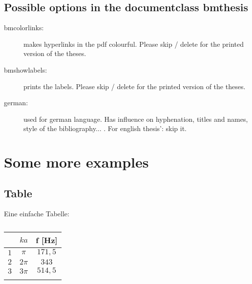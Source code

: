 \subsection{Possible options in the documentclass bmthesis}

\begin{description}
	\item[bmcolorlinks:]  makes hyperlinks in the pdf colourful. Please skip / delete for the printed version of the theses.
	\item[bmshowlabels:] prints the labels. Please skip / delete for the printed version of the theses.
	\item[german:] used for german language. Has influence on hyphenation, titles and names, style of the bibliography... . For english thesis': skip it.
\end{description}


\section{Some more examples}
\label{sec:more_ex}
\subsection{Table}
\label{sec:table}
Eine einfache Tabelle:

\begin{table}[htb]
	\centering
		\begin{tabular}{ccc} \firsthline
	   &  $ka$ & f [Hz] \\\hline
		$1$ & $\pi$ & $171,5$ \\
		$2$ & $2\pi$ & $343$ \\
		$3$ & $3\pi$ & $514,5$ \\\lasthline
		\end{tabular}
	\caption[Die ersten drei symmetrischen Eigenwerte für das innere Problem des Kugelkörpers]{}
	\label{tab:tabelle1}
\end{table}

